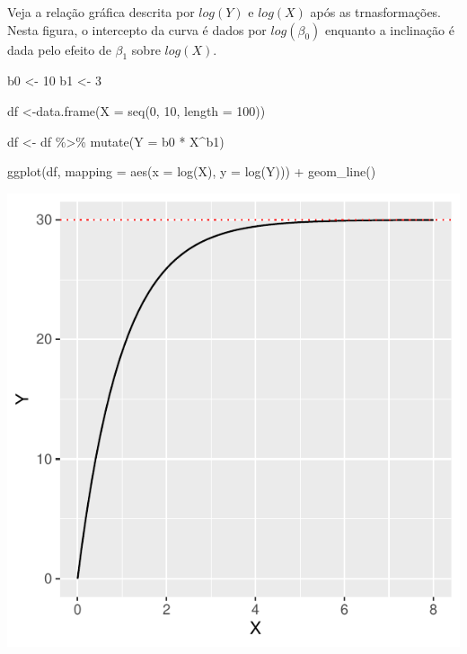 \documentclass[
]{book}
\newenvironment{Shaded}{\begin{snugshade}}{\end{snugshade}}
\newcommand{\AttributeTok}[1]{\textcolor[rgb]{0.77,0.63,0.00}{#1}}
\newcommand{\DecValTok}[1]{\textcolor[rgb]{0.00,0.00,0.81}{#1}}
\newcommand{\FunctionTok}[1]{\textcolor[rgb]{0.00,0.00,0.00}{#1}}
\newcommand{\NormalTok}[1]{#1}
\newcommand{\OtherTok}[1]{\textcolor[rgb]{0.56,0.35,0.01}{#1}}
\newcommand{\SpecialCharTok}[1]{\textcolor[rgb]{0.00,0.00,0.00}{#1}}
\begin{document}
Veja a relação gráfica descrita por \(log(Y)\) e \(log(X)\) após as trnasformações. Nesta figura, o intercepto da curva é dados por \(log(\beta_0)\) enquanto a inclinação é dada pelo efeito de \(\beta_1\) sobre \(log(X)\).

\begin{Shaded}
\begin{Highlighting}[]
\NormalTok{b0 }\OtherTok{\textless{}{-}} \DecValTok{10}
\NormalTok{b1 }\OtherTok{\textless{}{-}} \DecValTok{3}

\NormalTok{df }\OtherTok{\textless{}{-}}\FunctionTok{data.frame}\NormalTok{(}\AttributeTok{X =} \FunctionTok{seq}\NormalTok{(}\DecValTok{0}\NormalTok{, }\DecValTok{10}\NormalTok{, }\AttributeTok{length =} \DecValTok{100}\NormalTok{))}

\NormalTok{df }\OtherTok{\textless{}{-}}\NormalTok{ df }\SpecialCharTok{\%\textgreater{}\%} \FunctionTok{mutate}\NormalTok{(}\AttributeTok{Y =}\NormalTok{ b0 }\SpecialCharTok{*}\NormalTok{ X}\SpecialCharTok{\^{}}\NormalTok{b1)}

\FunctionTok{ggplot}\NormalTok{(df, }\AttributeTok{mapping =} \FunctionTok{aes}\NormalTok{(}\AttributeTok{x =} \FunctionTok{log}\NormalTok{(X), }\AttributeTok{y =} \FunctionTok{log}\NormalTok{(Y))) }\SpecialCharTok{+}
  \FunctionTok{geom\_line}\NormalTok{()}
\end{Highlighting}
\end{Shaded}

\begin{center}\includegraphics{probest-cambientais_files/figure-latex/unnamed-chunk-223-1} \end{center}
\end{document}
